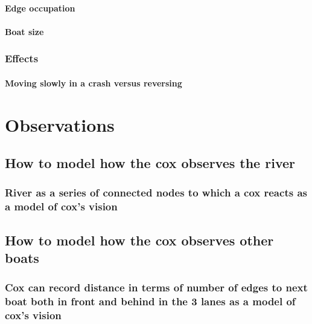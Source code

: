         \paragraph{Edge occupation}
        \paragraph{Boat size}
      \subsubsection{Effects}
        \paragraph{Moving slowly in a crash versus reversing}
  
  \section{Observations}
    \subsection{How to model how the cox observes the river}
      \subsubsection{River as a series of connected nodes to which a cox reacts as a model of cox's vision}
    \subsection{How to model how the cox observes other boats}
      \subsubsection{Cox can record distance in terms of number of edges to next boat both in front and behind in the 3 lanes as a model of cox's vision}
